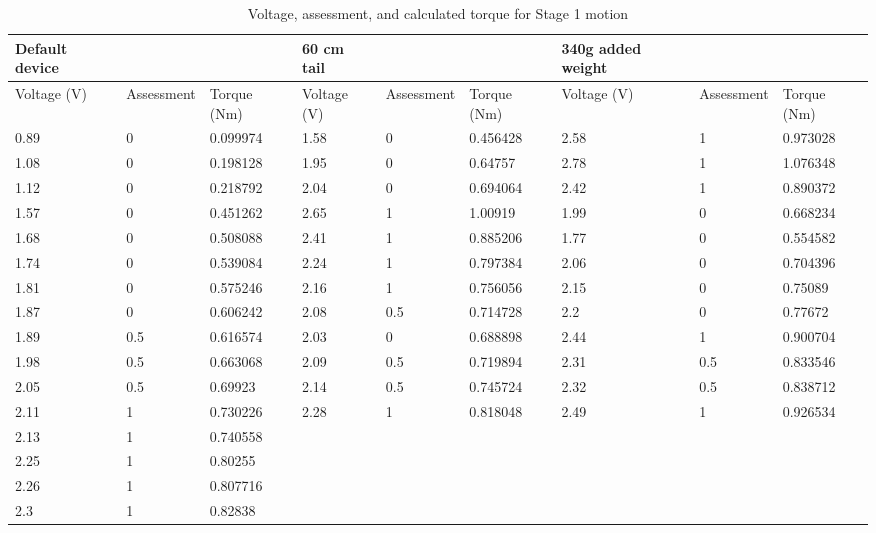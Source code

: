 \begin{landscape}

\begin{table}[!ht]
	\centering
	\caption{Voltage, assessment, and calculated torque for Stage 1 motion}
	\footnotesize
	\begin{tabular}{|l|l|l|l|l|l|l|l|l|}
		\hline
		Default device & ~ & ~ & 60 cm tail & ~ & ~ & 340g added weight & ~ & ~ \\ \hline
		Voltage (V) & Assessment & Torque (Nm) & Voltage (V) & Assessment & Torque (Nm) & Voltage (V) & Assessment & Torque (Nm) \\ \hline
		0.89 & 0 & 0.099974 & 1.58 & 0 & 0.456428 & 2.58 & 1 & 0.973028 \\ \hline
		1.08 & 0 & 0.198128 & 1.95 & 0 & 0.64757 & 2.78 & 1 & 1.076348 \\ \hline
		1.12 & 0 & 0.218792 & 2.04 & 0 & 0.694064 & 2.42 & 1 & 0.890372 \\ \hline
		1.57 & 0 & 0.451262 & 2.65 & 1 & 1.00919 & 1.99 & 0 & 0.668234 \\ \hline
		1.68 & 0 & 0.508088 & 2.41 & 1 & 0.885206 & 1.77 & 0 & 0.554582 \\ \hline
		1.74 & 0 & 0.539084 & 2.24 & 1 & 0.797384 & 2.06 & 0 & 0.704396 \\ \hline
		1.81 & 0 & 0.575246 & 2.16 & 1 & 0.756056 & 2.15 & 0 & 0.75089 \\ \hline
		1.87 & 0 & 0.606242 & 2.08 & 0.5 & 0.714728 & 2.2 & 0 & 0.77672 \\ \hline
		1.89 & 0.5 & 0.616574 & 2.03 & 0 & 0.688898 & 2.44 & 1 & 0.900704 \\ \hline
		1.98 & 0.5 & 0.663068 & 2.09 & 0.5 & 0.719894 & 2.31 & 0.5 & 0.833546 \\ \hline
		2.05 & 0.5 & 0.69923 & 2.14 & 0.5 & 0.745724 & 2.32 & 0.5 & 0.838712 \\ \hline
		2.11 & 1 & 0.730226 & 2.28 & 1 & 0.818048 & 2.49 & 1 & 0.926534 \\ \hline
		2.13 & 1 & 0.740558 & ~ & ~ & ~ & ~ & ~ & ~ \\ \hline
		2.25 & 1 & 0.80255 & ~ & ~ & ~ & ~ & ~ & ~ \\ \hline
		2.26 & 1 & 0.807716 & ~ & ~ & ~ & ~ & ~ & ~ \\ \hline
		2.3 & 1 & 0.82838   & ~ & ~ & ~ & ~ & ~ & ~ \\ \hline
	\end{tabular}
\end{table}


\end{landscape}
